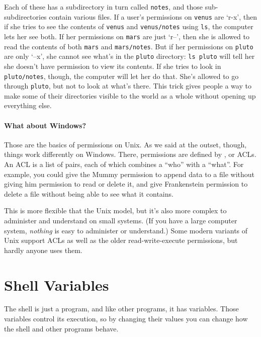 \documentclass{book}
\begin{document}
Each of these has a subdirectory in turn called \texttt{notes}, and
those sub-subdirectories contain various files. If a user's permissions
on \texttt{venus} are `r-x', then if she tries to see the contents of
\texttt{venus} and \texttt{venus/notes} using \texttt{ls}, the computer
lets her see both. If her permissions on \texttt{mars} are just `r--',
then she is allowed to read the contents of both \texttt{mars} and
\texttt{mars/notes}. But if her permissions on \texttt{pluto} are only
`--x', she cannot see what's in the \texttt{pluto} directory:
\texttt{ls pluto} will tell her she doesn't have permission to view its
contents. If she tries to look in \texttt{pluto/notes}, though, the
computer will let her do that. She's allowed to go through
\texttt{pluto}, but not to look at what's there. This trick gives people
a way to make some of their directories visible to the world as a whole
without opening up everything else.

\mbox{}\paragraph{What about Windows?}

Those are the basics of permissions on Unix. As we said at the outset,
though, things work differently on Windows. There, permissions are
defined by , or
ACLs. An ACL is a list of pairs, each of which combines a ``who'' with a
``what''. For example, you could give the Mummy permission to append
data to a file without giving him permission to read or delete it, and
give Frankenstein permission to delete a file without being able to see
what it contains.

This is more flexible that the Unix model, but it's also more complex to
administer and understand on small systems. (If you have a large
computer system, \emph{nothing} is easy to administer or understand.)
Some modern variants of Unix support ACLs as well as the older
read-write-execute permissions, but hardly anyone uses them.

\section{Shell Variables}

The shell is just a program, and like other programs, it has variables.
Those variables control its execution, so by changing their values you
can change how the shell and other programs behave.
\end{document}
